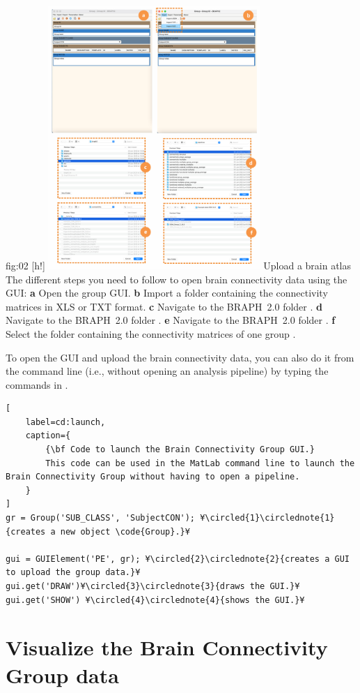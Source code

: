\documentclass[justified]{tufte-handout}
\begin{document}
	{fig:02}
	{
	[h!]
	\includegraphics[height=10cm]{fig02.png}
	}
	{Upload a brain atlas}
	{
	The different steps you need to follow to open brain connectivity data using the GUI: 
	{\bf a} Open the group GUI.
	{\bf b} Import a folder containing the connectivity matrices in XLS or TXT format.
	{\bf c} Navigate to the BRAPH~2.0 folder .
	{\bf d} Navigate to the BRAPH~2.0 folder .
	{\bf e} Navigate to the BRAPH~2.0 folder .
	{\bf f} Select the folder containing the connectivity matrices of one group .
	}

To open the GUI and upload the brain connectivity data, you can also do it from the command line (i.e., without opening an analysis pipeline) by typing the commands in .
%
\begin{lstlisting}[
	label=cd:launch,
	caption={
		{\bf Code to launch the Brain Connectivity Group GUI.}
		This code can be used in the MatLab command line to launch the Brain Connectivity Group without having to open a pipeline.
	}
]
gr = Group('SUB_CLASS', 'SubjectCON'); ¥\circled{1}\circlednote{1}{creates a new object \code{Group}.}¥

gui = GUIElement('PE', gr); ¥\circled{2}\circlednote{2}{creates a GUI to upload the group data.}¥
gui.get('DRAW')¥\circled{3}\circlednote{3}{draws the GUI.}¥
gui.get('SHOW') ¥\circled{4}\circlednote{4}{shows the GUI.}¥
\end{lstlisting}

\clearpage
\section{Visualize the Brain Connectivity Group data}
\end{document}
